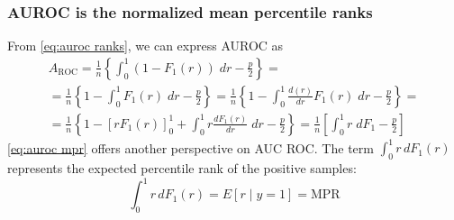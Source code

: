 

\subsubsection{AUROC is the normalized mean percentile ranks}
\label{sec:auroc mpr}

From \autoref{eq:auroc ranks}, we can express AUROC as
%
\begin{multline}
    A_\text{ROC}
        = \frac{1}{n} \left\{
            \int_{0}^{1} (1 - F_1(r)) \;dr - \frac{p}{2}
        \right\}
    =\\
        = \frac{1}{n} \left\{
            1 - \int_{0}^{1} F_1(r) \;dr - \frac{p}{2}
        \right\}
        = \frac{1}{n} \left\{
            1 - \int_{0}^{1} \frac{d(r)}{dr}F_1(r) \;dr - \frac{p}{2}
        \right\}
    =\\
        = \frac{1}{n} \left\{
            1 - \left[rF_1(r)\right]_0^1 + \int_{0}^{1} r \frac{d F_1(r)}{dr} \;dr - \frac{p}{2}
        \right\}
        = \frac{1}{n} \left[
            \int_{0}^{1} r \;d F_1 - \frac{p}{2}
        \right]
    \label{eq:auroc mpr}
\end{multline}
%
\autoref{eq:auroc mpr} offers another perspective on AUC ROC. The term $\int_{0}^{1} r\,d F_1(r)$ represents the expected percentile rank of the positive samples:
%
\begin{equation}
    \int_{0}^{1} r\,d F_1(r) = E[r \mid y = 1] = \text{MPR}
    \label{eq:mpr}    
\end{equation}
%
%
